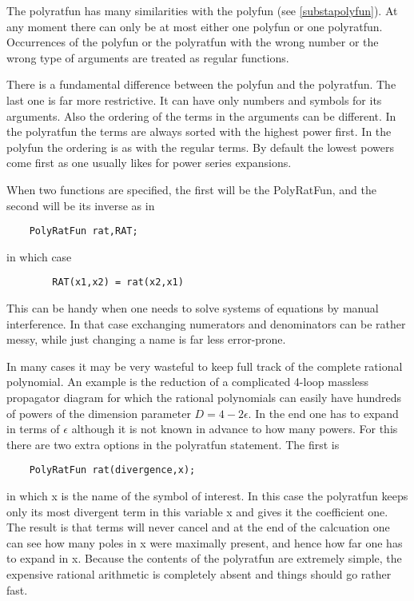 \noindent The polyratfun has many similarities with the polyfun (see 
\ref{substapolyfun}). At any moment there can only be at most either one 
polyfun or one polyratfun. Occurrences of the polyfun or the polyratfun 
with the wrong number or the wrong type of arguments are treated as regular 
functions.

\noindent There is a fundamental difference between the polyfun and the 
polyratfun. The last one is far more restrictive. It can have only numbers 
and symbols for its arguments. Also the ordering of the terms in the 
arguments can be different. In the polyratfun the terms are always sorted 
with the highest power first. In the polyfun the ordering is as with the 
regular terms. By default the lowest powers come first as one usually likes 
for power series expansions.

\noindent When two functions are specified, the first will be the 
PolyRatFun, and the second will be its inverse as in
\begin{verbatim}
    PolyRatFun rat,RAT;
\end{verbatim}
in which case
\begin{verbatim}
        RAT(x1,x2) = rat(x2,x1)
\end{verbatim}
This can be handy when one needs to solve systems of equations by manual 
interference. In that case exchanging numerators and denominators can be 
rather messy, while just changing a name is far less error-prone.

\noindent In many cases it may be very wasteful to keep full track of the 
complete rational polynomial. An example is the reduction of a complicated 
4-loop massless propagator diagram for which the rational polynomials can 
easily have hundreds of powers of the dimension parameter $D=4-2\epsilon$. 
In the end one has to expand in terms of $\epsilon$ although it is not 
known in advance to how many powers. For this there are two extra options 
in the polyratfun statement. The first is
\begin{verbatim}
    PolyRatFun rat(divergence,x);
\end{verbatim}
in which x is the name of the symbol of interest. In this case the 
polyratfun keeps only its most divergent term in this variable x and gives 
it the coefficient one. The result is that terms will never cancel and at 
the end of the calcuation one can see how many poles in x were maximally 
present, and hence how far one has to expand in x. Because the contents of 
the polyratfun are extremely simple, the expensive rational arithmetic is 
completely absent and things should go rather fast.

